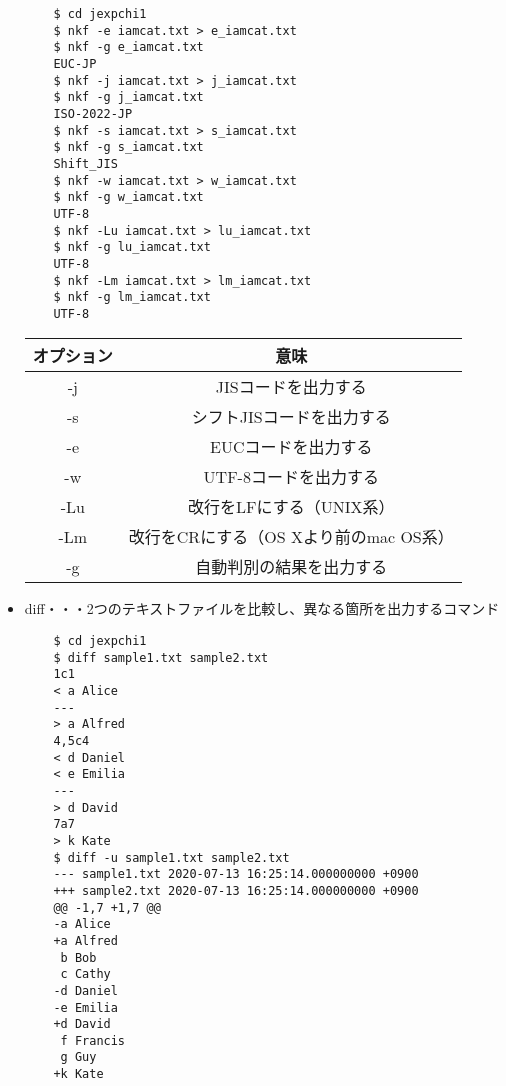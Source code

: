 \documentclass[a4paper,12pt]{jarticle}
\begin{document}
\begin{itemize}
          \begin{lstlisting}
    $ cd jexpchi1
    $ nkf -e iamcat.txt > e_iamcat.txt
    $ nkf -g e_iamcat.txt
    EUC-JP
    $ nkf -j iamcat.txt > j_iamcat.txt
    $ nkf -g j_iamcat.txt
    ISO-2022-JP
    $ nkf -s iamcat.txt > s_iamcat.txt
    $ nkf -g s_iamcat.txt
    Shift_JIS
    $ nkf -w iamcat.txt > w_iamcat.txt
    $ nkf -g w_iamcat.txt
    UTF-8
    $ nkf -Lu iamcat.txt > lu_iamcat.txt
    $ nkf -g lu_iamcat.txt
    UTF-8
    $ nkf -Lm iamcat.txt > lm_iamcat.txt
    $ nkf -g lm_iamcat.txt
    UTF-8
        \end{lstlisting}
          \begin{table}[h]
              \begin{center}
                  \begin{tabular}{|c|c|} \hline
                      オプション & 意味                                   \\ \hline
                      -j         & JISコードを出力する                    \\ \hline
                      -s         & シフトJISコードを出力する              \\ \hline
                      -e         & EUCコードを出力する                    \\ \hline
                      -w         & UTF-8コードを出力する                  \\ \hline
                      -Lu        & 改行をLFにする（UNIX系）               \\ \hline
                      -Lm        & 改行をCRにする（OS Xより前のmac OS系） \\ \hline
                      -g         & 自動判別の結果を出力する               \\ \hline
                  \end{tabular}
              \end{center}
          \end{table}
          \clearpage
    \item diff・・・2つのテキストファイルを比較し、異なる箇所を出力するコマンド
          \begin{lstlisting}
    $ cd jexpchi1
    $ diff sample1.txt sample2.txt
    1c1
    < a Alice
    ---
    > a Alfred
    4,5c4
    < d Daniel
    < e Emilia
    ---
    > d David
    7a7
    > k Kate
    $ diff -u sample1.txt sample2.txt
    --- sample1.txt	2020-07-13 16:25:14.000000000 +0900
    +++ sample2.txt	2020-07-13 16:25:14.000000000 +0900
    @@ -1,7 +1,7 @@
    -a Alice
    +a Alfred
     b Bob
     c Cathy
    -d Daniel
    -e Emilia
    +d David
     f Francis
     g Guy
    +k Kate
            \end{lstlisting}


\end{itemize}
\end{document}
